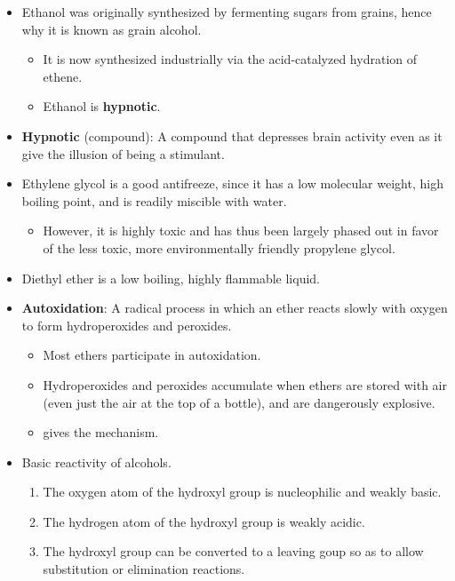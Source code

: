 \documentclass[../notes.tex]{subfiles}
\begin{document}
\begin{itemize}
\begin{itemize}
    \end{itemize}
    \item Ethanol was originally synthesized by fermenting sugars from grains, hence why it is known as grain alcohol.
    \begin{itemize}
        \item It is now synthesized industrially via the acid-catalyzed hydration of ethene.
        \item Ethanol is \textbf{hypnotic}.
    \end{itemize}
    \item \textbf{Hypnotic} (compound): A compound that depresses brain activity even as it give the illusion of being a stimulant.
    \item Ethylene glycol is a good antifreeze, since it has a low molecular weight, high boiling point, and is readily miscible with water.
    \begin{itemize}
        \item However, it is highly toxic and has thus been largely phased out in favor of the less toxic, more environmentally friendly propylene glycol.
    \end{itemize}
    \item Diethyl ether is a low boiling, highly flammable liquid.
    \item \textbf{Autoxidation}: A radical process in which an ether reacts slowly with oxygen to form hydroperoxides and peroxides.
    \begin{itemize}
        \item Most ethers participate in autoxidation.
        \item Hydroperoxides and peroxides accumulate when ethers are stored with air (even just the air at the top of a bottle), and are dangerously explosive.
        \item \textcite{bib:SolomonsEtAl} gives the mechanism.
    \end{itemize}
    \item Basic reactivity of alcohols.
    \begin{enumerate}
        \item The oxygen atom of the hydroxyl group is nucleophilic and weakly basic.
        \item The hydrogen atom of the hydroxyl group is weakly acidic.
        \item The hydroxyl group can be converted to a leaving goup so as to allow substitution or elimination reactions.
    \end{enumerate}

\end{itemize}
\end{document}

